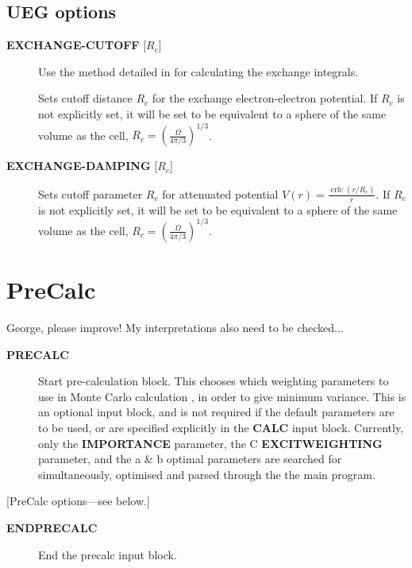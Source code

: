 \documentclass[openany,a4paper,10pt]{manual}
\begin{document}
\subsection{UEG options}
\begin{description}
\item[\textbf{EXCHANGE-CUTOFF} {[}$R_c${]}]
Use the method detailed in \cite{AttenEx} for calculating the exchange
integrals.

Sets cutoff distance $R_c$ for the exchange electron-electron
potential.  If $R_c$ is not explicitly set, it will
be set to be equivalent to a sphere of the same volume as the cell,
$R_c=(\frac{\Omega}{4\pi/3})^{1/3}$.

\item[\textbf{EXCHANGE-DAMPING} {[}$R_c${]}]
Sets cutoff parameter $R_c$ for attenuated potential
$V(r)=\frac{\operatorname{erfc}(r/R_c)}{r}$.  If $R_c$ is not explicitly set,
it will be set to be equivalent to a sphere of the same volume as the cell,
$R_c=(\frac{\Omega}{4\pi/3})^{1/3}$.

\end{description}

\resetcurrentobjects


\hypertarget{input-precalc}{}\section{PreCalc}

\begin{notice}[note]
George, please improve!  My interpretations also need to be checked...
\end{notice}
\begin{description}
\item[\textbf{PRECALC}]
Start pre-calculation block.  This chooses which weighting parameters
to use in Monte Carlo calculation , in order to give minimum variance.
This is an optional input block, and is not required if the default
parameters are to be used, or are specified explicitly in the \textbf{CALC}
input block.  Currently, only the \textbf{IMPORTANCE} parameter, the C
\textbf{EXCITWEIGHTING} parameter, and the a \& b optimal parameters are
searched for simultaneously, optimised and parsed through the the
main program.

\end{description}

{[}PreCalc options---see below.{]}
\begin{description}
\item[\textbf{ENDPRECALC}]
End the precalc input block.

\end{description}
\end{document}
